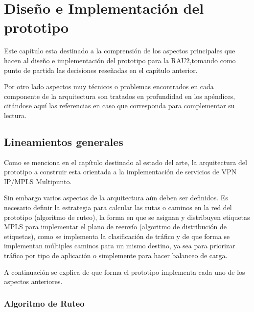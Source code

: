 \chapter{Dise\~no e Implementaci\'on del prototipo}

\ifpdf
    \graphicspath{{Chapter4/Figs/Raster/}{Chapter4/Figs/PDF/}{Chapter4/Figs/}}
\else
    \graphicspath{{Chapter4/Figs/Vector/}{Chapter4/Figs/}}
\fi

Este cap\'itulo esta destinado a la comprensi\'on de los aspectos principales que hacen al dise\~no e implementaci\'on del prototipo para la RAU2,tomando como punto de partida las decisiones reseñadas en el cap\'itulo anterior.


Por otro lado aspectos muy t\'ecnicos o problemas encontrados en cada componente de la arquitectura son tratados en profundidad en los ap\'endices, citándose aquí las referencias en caso que corresponda para complementar su lectura.\\

\section[Lineamientos generales]{Lineamientos generales}

Como se menciona en el cap\'itulo destinado al estado del arte, la arquitectura del prototipo a construir esta orientada a la implementaci\'on de servicios de VPN IP/MPLS Multipunto.

Sin embargo varios aspectos de la arquitectura a\'un deben ser definidos. Es necesario definir la estrategia para calcular las rutas o caminos en la red del prototipo (algoritmo de ruteo), la forma en que se asignan y distribuyen etiquetas MPLS para implementar el plano de reenvío (algoritmo de distribución de etiquetas), como se implementa la clasificaci\'on de tr\'afico y de que forma se implementan múltiples caminos para un mismo destino, ya sea para priorizar tr\'afico por tipo de aplicaci\'on o simplemente para hacer balanceo de carga. 

A continuaci\'on se explica de que forma el prototipo implementa cada uno de los aspectos anteriores.

\subsection{Algoritmo de Ruteo}

